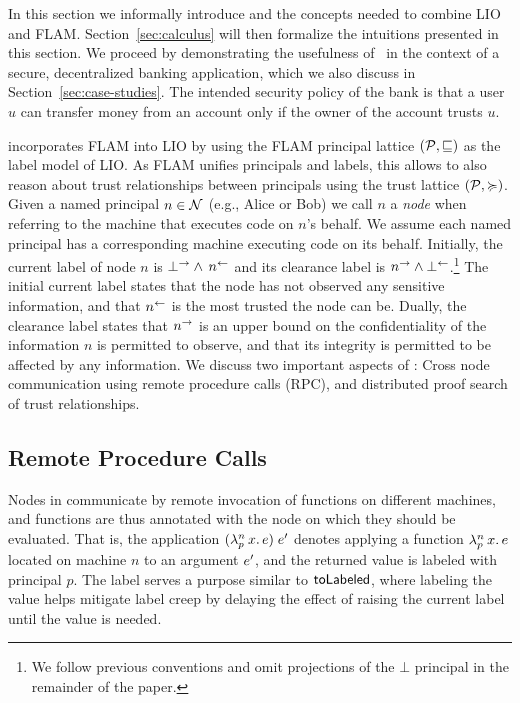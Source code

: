 In this section we informally introduce \lang{} and the concepts needed to combine LIO and FLAM. Section~\ref{sec:calculus} will then formalize the intuitions presented in this section. We proceed by demonstrating the usefulness of \lang{}\ in the context of a secure, decentralized banking application, which we also discuss in Section~\ref{sec:case-studies}. The intended security policy of the bank is that a user $u$ can transfer money from an account only if the owner of the account trusts $u$.

\lang{} incorporates FLAM into LIO by using the FLAM principal lattice $(\mathcal{P}, \sqsubseteq)$ as the label model of LIO. As FLAM unifies principals and labels, this allows \lang{} to also reason about trust relationships between principals using the trust lattice $(\mathcal{P}, \succcurlyeq)$.
Given a named principal $n \in \mathcal{N}$ (e.g., Alice or Bob) we call $n$ a \emph{node} when referring to the machine that executes code on $n$'s behalf. We assume each named principal has a corresponding machine executing code on its behalf. Initially, the current label of node $n$ is $\bot^{\rightarrow} \wedge\, n^{\leftarrow}$ and its clearance label is $n^{\rightarrow} \wedge \bot^{\leftarrow}$.\footnote{We follow previous conventions \cite{Arden:2015:FA:2859845.2859998} and omit projections of the $\bot$ principal in the remainder of the paper.} The initial current label states that the node has not observed any sensitive information, and that $n^{\leftarrow}$ is the most trusted the node can be. Dually, the clearance label states that $n^{\rightarrow}$ is an upper bound on the confidentiality of the information $n$ is permitted to observe, and that its integrity is permitted to be affected by any information. We discuss two important aspects of \lang: Cross node communication using remote procedure calls (RPC), and distributed proof search of trust relationships.

\subsection{Remote Procedure Calls}
Nodes in \lang{} communicate by remote invocation of functions on different machines, and functions are thus annotated with the node on which they should be evaluated. That is, the application $(\lambda^{n}_{p}\,x.\,e)\;e'$ denotes applying a function $\lambda^{n}_{p}\,x.\,e$ located on machine $n$ to an argument $e'$, and the returned value is labeled with principal $p$. The label serves a purpose similar to $\mathsf{toLabeled}$, where labeling the value helps mitigate label creep by delaying the effect of raising the current label until the value is needed.

